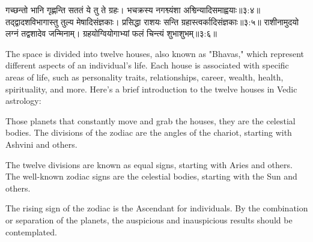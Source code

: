 \begin{sanskrit}
	\begin{center}
		गच्छन्तो भानि गृह्णन्ति सततं ये तु ते ग्रहः।
		भचक्रस्य नगश्व्यंशा अश्विन्यादिसमाह्वयाः॥३:४॥\cite{BrihatParasharHoraShastraVol1, wiki:bphs}\label{Dictum1}
		तद्‌द्वादशविभागास्तु तुल्य मेषादिसंज्ञकाः।
		प्रसिद्धा राशयः सन्ति ग्रहास्त्वर्कादिसंज्ञकाः॥३:५॥\cite{BrihatParasharHoraShastraVol1, wiki:bphs}\label{Dictum2}
		राशीनामुदयो लग्नं तद्वशादेव जन्मिनाम्‌।
		ग्रहयोग्वियोगाभ्यां फलं चिन्त्यं शुभाशुभम्‌॥३:६॥\cite{BrihatParasharHoraShastraVol1, wiki:bphs}\label{Dictum3}
	\end{center}
\end{sanskrit}
The space is divided into twelve houses, also known as "Bhavas," which represent different aspects of an individual's life. Each house is associated with specific areas of life, such as personality traits, relationships, career, wealth, health, spirituality, and more. Here's a brief introduction to the twelve houses in Vedic astrology:

Those planets that constantly move and grab the houses, they are the celestial bodies. The divisions of the zodiac are the angles of the chariot, starting with Ashvini and others.

The twelve divisions are known as equal signs, starting with Aries and others. The well-known zodiac signs are the celestial bodies, starting with the Sun and others.

The rising sign of the zodiac is the Ascendant for individuals. By the combination or separation of the planets, the auspicious and inauspicious results should be contemplated.

